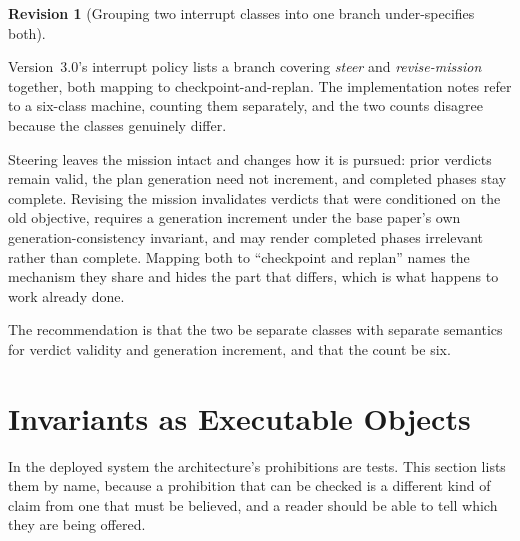 \documentclass[11pt]{article}
\newtheorem{revision}{Revision}
\begin{document}
\begin{revision}[Grouping two interrupt classes into one branch under-specifies both]
\label{rev:interrupt}
\end{revision}

\noindent Version~3.0's interrupt policy lists a branch covering \emph{steer} and \emph{revise-mission} together, both mapping to checkpoint-and-replan. The implementation notes refer to a six-class machine, counting them separately, and the two counts disagree because the classes genuinely differ.

Steering leaves the mission intact and changes how it is pursued: prior verdicts remain valid, the plan generation need not increment, and completed phases stay complete. Revising the mission invalidates verdicts that were conditioned on the old objective, requires a generation increment under the base paper's own generation-consistency invariant, and may render completed phases irrelevant rather than complete. Mapping both to ``checkpoint and replan'' names the mechanism they share and hides the part that differs, which is what happens to work already done.

The recommendation is that the two be separate classes with separate semantics for verdict validity and generation increment, and that the count be six.

\section{Invariants as Executable Objects}
\label{sec:executable}

In the deployed system the architecture's prohibitions are tests. This section lists them by name, because a prohibition that can be checked is a different kind of claim from one that must be believed, and a reader should be able to tell which they are being offered.
\end{document}
